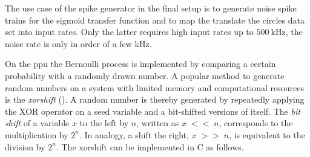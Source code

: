 The use case of the spike generator in the final setup is to generate noise spike trains for the sigmoid transfer function and to map the translate the circles data set into input rates. Only the latter requires high input rates up to $\SI{500}{\kilo \Hz}$, the noise rate is only in order of a few $\si{\kilo \Hz}$.

On the \gls{ppu} the Bernoulli process is implemented by comparing a certain probability with a randomly drawn number. A popular method to generate random numbers on a system with limited memory and computational resources is the \emph{xorshift} (\citealp{marsaglia2003xorshift}). A random number is thereby generated by repeatedly applying the XOR operator on a seed variable and a bit-shifted versions of itself. The \emph{bit shift} of a variable $x$ to the left by $n$, written as $x\;{\scriptstyle<<}\;n$, corresponds to the multiplication by $2^n$. In analogy, a shift the right, $x\;{\scriptstyle>>}\;n$, is equivalent to the division by $2^n$. The xorshift can be implemented in C as follows.


